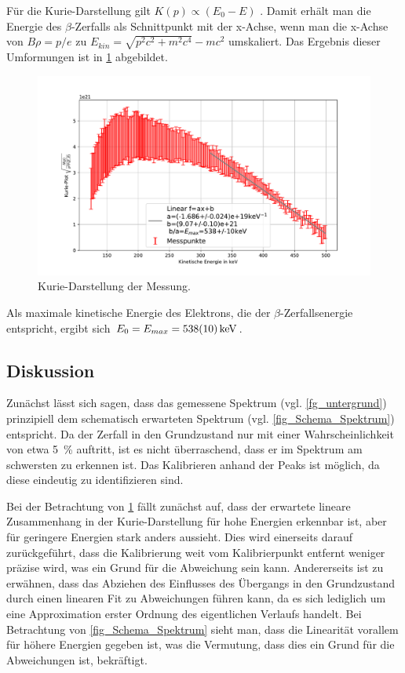 \documentclass[
	a4paper,
	12pt,
	pagesize,
	ngerman
]{scrartcl}
\begin{document}
	Für die Kurie-Darstellung gilt $K(p)\propto (E_0-E)$ \cite{Anleitung}.
	Damit erhält man die Energie des $\beta$-Zerfalls als Schnittpunkt mit der x-Achse, wenn man die x-Achse von $B\rho=p/e$ zu $E_{kin}=\sqrt{p^2c^2+m^2c^4}-mc^2$ umskaliert.
	Das Ergebnis dieser Umformungen ist in \cref{fg_kurie} abgebildet.
	\begin{figure}[H]
			\includegraphics[width=  \linewidth]{img/kurie}
			\caption{
			Kurie-Darstellung der Messung.
			}
			\label{fg_kurie}
	\end{figure}
	Als maximale kinetische Energie des Elektrons, die der $\beta$-Zerfallsenergie entspricht, ergibt sich $E_0=E_{max}=\SI{538+-10}{keV}$.
	\subsection{Diskussion}
	Zunächst lässt sich sagen, dass das gemessene Spektrum (vgl. \cref{fg_untergrund}) prinzipiell dem schematisch erwarteten Spektrum (vgl. \cref{fig_Schema_Spektrum}) entspricht.
	Da der Zerfall in den Grundzustand nur mit einer Wahrscheinlichkeit von etwa \SI{5}{\percent} auftritt, ist es nicht überraschend, dass er im Spektrum am schwersten zu erkennen ist.
	Das Kalibrieren anhand der Peaks ist möglich, da diese eindeutig zu identifizieren sind.

	Bei der Betrachtung von \cref{fg_kurie} fällt zunächst auf, dass der erwartete lineare Zusammenhang in der Kurie-Darstellung für hohe Energien erkennbar ist, aber für geringere Energien stark anders aussieht.
	Dies wird einerseits darauf zurückgeführt, dass die Kalibrierung weit vom Kalibrierpunkt entfernt weniger präzise wird, was ein Grund für die Abweichung sein kann.
	Andererseits ist zu erwähnen, dass das Abziehen des Einflusses des Übergangs in den Grundzustand durch einen linearen Fit zu Abweichungen führen kann, da es sich lediglich um eine Approximation erster Ordnung des eigentlichen Verlaufs handelt.
	Bei Betrachtung von \cref{fig_Schema_Spektrum} sieht man, dass die Linearität vorallem für höhere Energien gegeben ist, was die Vermutung, dass dies ein Grund für die Abweichungen ist, bekräftigt.
\end{document}
